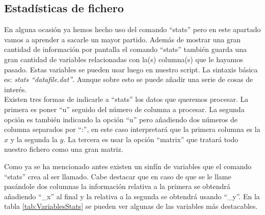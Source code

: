 \documentclass[11pt,a4paper,twoside,pdf]{article}
\numberwithin{equation}{section}
\begin{document}
\subsection{Estadísticas de fichero}

En alguna ocasión ya hemos hecho uso del comando ``stats'' pero en este apartado vamos a aprender a sacarle un mayor partido. Además de mostrar una gran cantidad de información por pantalla el comando ``stats'' también guarda una gran cantidad de variables relacionadas con la(s) columna(s) que le hayamos pasado. Estas variables se pueden usar luego en nuestro script. La sintaxis básica es: \textit{stats ``datafile.dat''}. Aunque sobre esto se puede añadir una serie de cosas de interés.  \\

Existen tres formas de indicarle a ``stats'' los datos que queremos procesar. La primera es poner ``u'' seguido del número de columna a procesar. La segunda opción es también indicando la opción ``u'' pero añadiendo dos números de columna separados por ``:'', en este caso interpretará que la primera columna es la $x$ y la segunda la $y$. La tercera es usar la opción ``matrix'' que tratará todo nuestro fichero como una gran matriz.

Como ya se ha mencionado antes existen un sinfín de variables que el comando ``stats'' crea al ser llamado. Cabe destacar que en caso de que se le llame pasándole dos columnas la información relativa a la primera se obtendrá añadiendo ``\_x'' al final y la relativa a la segunda se obtendrá usando ``\_y''. En la tabla \ref{tab:VariablesStats} se pueden ver algunas de las variables más destacables. \\
\end{document}
